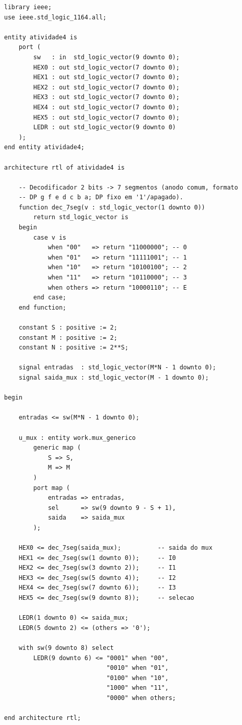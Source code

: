 \documentclass[12pt,a4paper, brazil]{article}
\begin{document}
\begin{lstlisting}[style=vhdl, caption={Arquivo \texttt{atividade4.vhd} -- instancia o mux com $S=2$, $M=2$ e mapeia as chaves, displays e LEDs da DE10-Lite.}]
library ieee;
use ieee.std_logic_1164.all;

entity atividade4 is
    port (
        sw   : in  std_logic_vector(9 downto 0);
        HEX0 : out std_logic_vector(7 downto 0);
        HEX1 : out std_logic_vector(7 downto 0);
        HEX2 : out std_logic_vector(7 downto 0);
        HEX3 : out std_logic_vector(7 downto 0);
        HEX4 : out std_logic_vector(7 downto 0);
        HEX5 : out std_logic_vector(7 downto 0);
        LEDR : out std_logic_vector(9 downto 0)
    );
end entity atividade4;

architecture rtl of atividade4 is

    -- Decodificador 2 bits -> 7 segmentos (anodo comum, formato
    -- DP g f e d c b a; DP fixo em '1'/apagado).
    function dec_7seg(v : std_logic_vector(1 downto 0))
        return std_logic_vector is
    begin
        case v is
            when "00"   => return "11000000"; -- 0
            when "01"   => return "11111001"; -- 1
            when "10"   => return "10100100"; -- 2
            when "11"   => return "10110000"; -- 3
            when others => return "10000110"; -- E
        end case;
    end function;

    constant S : positive := 2;
    constant M : positive := 2;
    constant N : positive := 2**S;

    signal entradas  : std_logic_vector(M*N - 1 downto 0);
    signal saida_mux : std_logic_vector(M - 1 downto 0);

begin

    entradas <= sw(M*N - 1 downto 0);

    u_mux : entity work.mux_generico
        generic map (
            S => S,
            M => M
        )
        port map (
            entradas => entradas,
            sel      => sw(9 downto 9 - S + 1),
            saida    => saida_mux
        );

    HEX0 <= dec_7seg(saida_mux);          -- saida do mux
    HEX1 <= dec_7seg(sw(1 downto 0));     -- I0
    HEX2 <= dec_7seg(sw(3 downto 2));     -- I1
    HEX3 <= dec_7seg(sw(5 downto 4));     -- I2
    HEX4 <= dec_7seg(sw(7 downto 6));     -- I3
    HEX5 <= dec_7seg(sw(9 downto 8));     -- selecao

    LEDR(1 downto 0) <= saida_mux;
    LEDR(5 downto 2) <= (others => '0');

    with sw(9 downto 8) select
        LEDR(9 downto 6) <= "0001" when "00",
                            "0010" when "01",
                            "0100" when "10",
                            "1000" when "11",
                            "0000" when others;

end architecture rtl;
\end{lstlisting}
\end{document}
